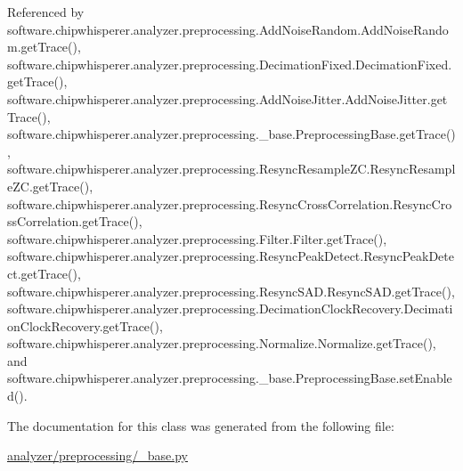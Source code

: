Referenced by software.\+chipwhisperer.\+analyzer.\+preprocessing.\+Add\+Noise\+Random.\+Add\+Noise\+Random.\+get\+Trace(), software.\+chipwhisperer.\+analyzer.\+preprocessing.\+Decimation\+Fixed.\+Decimation\+Fixed.\+get\+Trace(), software.\+chipwhisperer.\+analyzer.\+preprocessing.\+Add\+Noise\+Jitter.\+Add\+Noise\+Jitter.\+get\+Trace(), software.\+chipwhisperer.\+analyzer.\+preprocessing.\+\_\+base.\+Preprocessing\+Base.\+get\+Trace(), software.\+chipwhisperer.\+analyzer.\+preprocessing.\+Resync\+Resample\+Z\+C.\+Resync\+Resample\+Z\+C.\+get\+Trace(), software.\+chipwhisperer.\+analyzer.\+preprocessing.\+Resync\+Cross\+Correlation.\+Resync\+Cross\+Correlation.\+get\+Trace(), software.\+chipwhisperer.\+analyzer.\+preprocessing.\+Filter.\+Filter.\+get\+Trace(), software.\+chipwhisperer.\+analyzer.\+preprocessing.\+Resync\+Peak\+Detect.\+Resync\+Peak\+Detect.\+get\+Trace(), software.\+chipwhisperer.\+analyzer.\+preprocessing.\+Resync\+S\+A\+D.\+Resync\+S\+A\+D.\+get\+Trace(), software.\+chipwhisperer.\+analyzer.\+preprocessing.\+Decimation\+Clock\+Recovery.\+Decimation\+Clock\+Recovery.\+get\+Trace(), software.\+chipwhisperer.\+analyzer.\+preprocessing.\+Normalize.\+Normalize.\+get\+Trace(), and software.\+chipwhisperer.\+analyzer.\+preprocessing.\+\_\+base.\+Preprocessing\+Base.\+set\+Enabled().



The documentation for this class was generated from the following file\+:\begin{DoxyCompactItemize}
\item 
\hyperlink{analyzer_2preprocessing_2__base_8py}{analyzer/preprocessing/\+\_\+base.\+py}\end{DoxyCompactItemize}
